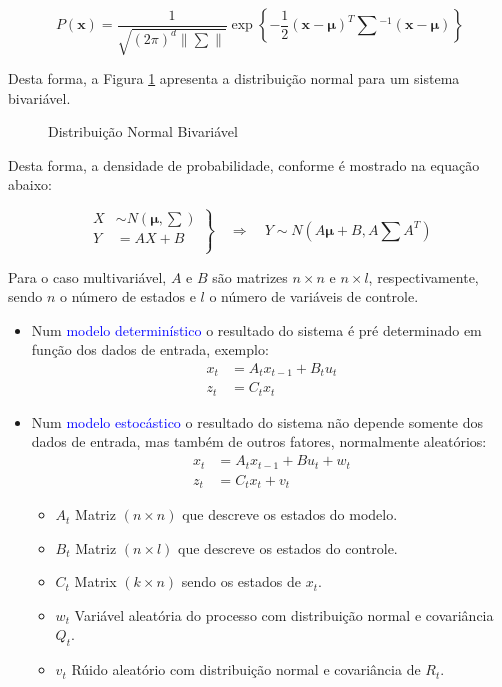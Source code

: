 \begin{equation}
    \label{eq::linearNd}
    P(\mathbf{x}) = \frac{1}{\sqrt{(2\pi)^d\|\textstyle\sum\|}}\exp\left\{-\frac{1}{2} (\mathbf{x}-\boldsymbol\mu)^T\textstyle\sum{}^{-1}(\mathbf{x}-\boldsymbol\mu)\right\}
\end{equation}

Desta forma, a Figura \ref{fig::gauss2} apresenta a distribuição normal para um sistema bivariável.


\begin{figure}[!ht]
    \centering
    
    \caption{Distribuição Normal Bivariável}
    \label{fig::gauss2}
\end{figure}

Desta forma, a densidade de probabilidade, conforme é mostrado na equação abaixo:

\begin{equation}
    \left.
    \begin{aligned}
            X & \sim N\left(\boldsymbol\mu, \textstyle\sum\right)\\
            Y & = AX + B\\
    \end{aligned} \right\}
    \quad \Rightarrow \quad Y \sim N\left( A\boldsymbol\mu+B, A\textstyle\sum A^T \right)
\end{equation}

Para o caso multivariável, $A$ e $B$ são matrizes $n \times n$ e $n \times l$, respectivamente, sendo $n$ o número de estados e $l$ o número de variáveis de controle.


\begin{itemize}
    \item Num \textcolor{blue}{modelo determinístico} o resultado do sistema é pré determinado em função dos dados de entrada, exemplo:
    \begin{align*} 
        x_t &= A_t x_{t-1} + B_t u_t\\ 
        z_t &= C_t x_t
    \end{align*}
    \item Num \textcolor{blue}{modelo estocástico} o resultado do sistema não depende somente dos dados de entrada, mas também de outros fatores, normalmente
    aleatórios:
    \begin{align} 
        x_t &= A_t x_{t-1} + B u_t +  w_t\\ 
        z_t &= C_t x_t + v_t
    \end{align}
    \begin{itemize}
        \item $A_t$ Matriz $(n \times n)$ que descreve os estados do modelo.
        \item $B_t$ Matriz $(n \times l)$ que descreve os estados do controle.
        \item $C_t$ Matrix $(k\times n)$ sendo os estados de $x_t$.
        \item $ w_t$ Variável aleatória do processo com distribuição normal e covariância $Q_t$.
        \item $v_t$ Rúido aleatório com distribuição normal e covariância de $R_t$.
    \end{itemize}
\end{itemize}


